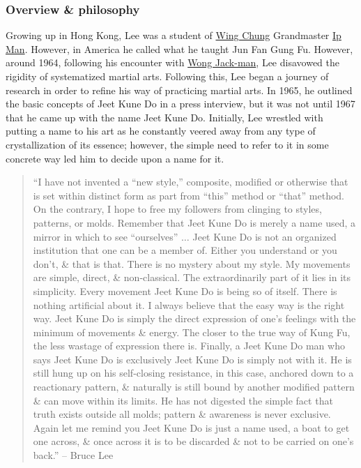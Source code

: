 \documentclass{article}
\begin{document}
\subsubsection{Overview \& philosophy}
Growing up in Hong Kong, {\sc Lee} was a student of \href{https://en.wikipedia.org/wiki/Wing_Chun}{Wing Chung} Grandmaster \href{https://en.wikipedia.org/wiki/Ip_Man}{Ip Man}. However, in America he called what he taught Jun Fan Gung Fu. However, around 1964, following his encounter with \href{https://en.wikipedia.org/wiki/Wong_Jack-man}{\sc Wong Jack-man}, {\sc Lee} disavowed the rigidity of systematized martial arts. Following this, {\sc Lee} began a journey of research in order to refine his way of practicing martial arts. In 1965, he outlined the basic concepts of Jeet Kune Do in a press interview, but it was not until 1967 that he came up with the name Jeet Kune Do. Initially, {\sc Lee} wrestled with putting a name to his art as he constantly veered away from any type of crystallization of its essence; however, the simple need to refer to it in some concrete way led him to decide upon a name for it.
\begin{quote}
	``I have not invented a ``new style,'' composite, modified or otherwise that is set within distinct form as part from ``this'' method or ``that'' method. On the contrary, I hope to free my followers from clinging to styles, patterns, or molds. Remember that Jeet Kune Do is merely a name used, a mirror in which to see ``ourselves'' $\ldots$ Jeet Kune Do is not an organized institution that one can be a member of. Either you understand or you don't, \& that is that. There is no mystery about my style. My movements are simple, direct, \& non-classical. The extraordinarily part of it lies in its simplicity. Every movement Jeet Kune Do is being so of itself. There is nothing artificial about it. I always believe that the easy way is the right way. Jeet Kune Do is simply the direct expression of one's feelings with the minimum of movements \& energy. The closer to the true way of Kung Fu, the less wastage of expression there is. Finally, a Jeet Kune Do man who says Jeet Kune Do is exclusively Jeet Kune Do is simply not with it. He is still hung up on his self-closing resistance, in this case, anchored down to a reactionary pattern, \& naturally is still bound by another modified pattern \& can move within its limits. He has not digested the simple fact that truth exists outside all molds; pattern \& awareness is never exclusive. Again let me remind you Jeet Kune Do is just a name used, a boat to get one across, \& once across it is to be discarded \& not to be carried on one's back.'' -- {\sc Bruce Lee}
\end{quote}
\end{document}
